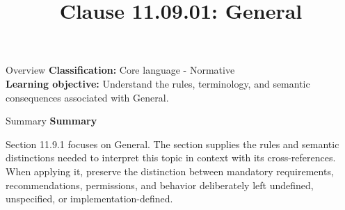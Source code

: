 \documentclass[10pt,letterpaper]{article}
\title{Clause 11.09.01: General}
\author{}
\date{}
\begin{document}
\maketitle
\begin{CornellOverviewBox}{Overview}
\textbf{Classification:} Core language - Normative\\[2pt]
\textbf{Learning objective:} Understand the rules, terminology, and semantic consequences associated with General.
\end{CornellOverviewBox}\begin{CornellSummaryBox}{Summary}
{\sffamily\bfseries\color{Accent} Summary}\par\vspace{3pt}Section 11.9.1 focuses on General. The section supplies the rules and semantic distinctions needed to interpret this topic in context with its cross-references. When applying it, preserve the distinction between mandatory requirements, recommendations, permissions, and behavior deliberately left undefined, unspecified, or implementation-defined.
\end{CornellSummaryBox}
\end{document}
